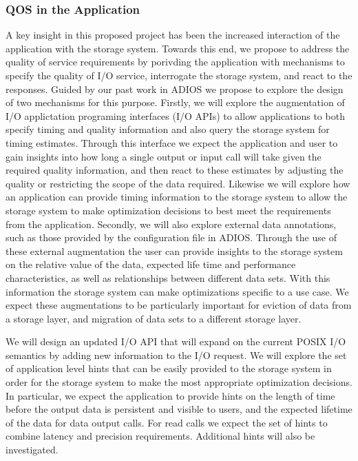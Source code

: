 \subsubsection{QOS in the Application}

A key insight in this proposed project has been the increased interaction of
the application with the storage system. Towards this end, we propose to
address the quality of service requirements by porivding the application
with mechanisms to specify the quality of I/O service, interrogate the
storage system, and react to the responses. Guided by our past work in
ADIOS\cite{lofstead2008flexible} we propose to explore the design of two
mechanisms for this purpose. Firstly, we will explore the augmentation of
I/O applictation programing interfaces (I/O APIs) to allow applications to
both specify timing and quality information and also query the storage
system for timing estimates. Through this interface we expect the
application and user to gain insights into how long a single output or input
call will take given the required quality information, and then react to
these estimates by adjusting the quality or restricting the scope of the
data required. Likewise we will explore how an application can provide
timing information to the storage system to allow the storage system to make
optimization decisions to best meet the requirements from the application. 
%
Secondly, we will also explore external data annotations, such as those
provided by the configuration file in ADIOS. Through the use of these
external augmentation the user can provide insights to the storage system on
the relative value of the data, expected life time and performance
characteristics, as well as relationships between different data sets. With
this information the storage system can make optimizations specific to a use
case. We expect these augmentations to be particularly important for
eviction of data from a storage layer, and migration of data sets to a
different storage layer. 

We will design an updated I/O API that will expand on the current POSIX I/O
semantics by adding new information to the I/O request. We will explore the
set of application level hints that can be easily provided to the storage
system in order for the storage system to make the most appropriate
optimization decisions. In particular, we expect the application to provide
hints on the length of time before the output data is persistent and
visible to users, and the expected lifetime of the data for data output
calls. For read calls we expect the set of hints to combine latency and
precision requirements. Additional hints will also be investigated. 

